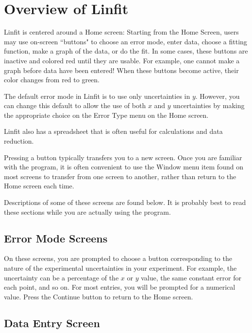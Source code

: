 \section*{Overview of Linfit}

Linfit is centered around a Home screen: Starting from
the Home Screen, users may use on-screen ``buttons" to choose an error
mode, enter data, choose a fitting function, make a graph of the data,
or do the fit.  In some cases, these buttons are inactive and colored
red until they are usable.  For example, one cannot make a graph
before data have been entered!  When these buttons become active,
their color changes from red to green.

The default error mode in Linfit is to use only uncertainties in $y$.
However, you can change this default to allow the use of both $x$ and
$y$ uncertainties by making the appropriate choice on the Error Type
menu on the Home screen.

Linfit also has a spreadsheet that is often useful for calculations
and data reduction.

Pressing a button typically transfers you to a new screen.  Once you
are familiar with the program, it is often convenient to use the Window menu
item found on most screens to transfer from one screen to another,
rather than return to the Home screen each time.

Descriptions of some of these screens are found below.  It is probably
best to read these sections while you are actually using the program.

\subsection*{Error Mode Screens}

On these screens, you are prompted to choose a button corresponding to
the nature of the experimental uncertainties in your experiment.  For
example, the uncertainty can be a percentage of the $x$ or $y$ value,
the same constant error for each point, and so on.  For most entries,
you will be prompted for a numerical value.  Press the Continue button
to return to the Home screen.

\subsection*{Data Entry Screen}

